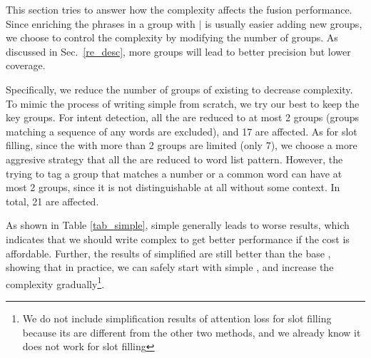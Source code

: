 This section tries to answer how the \RE complexity affects the fusion performance.
Since enriching the phrases in a \RE group with $|$ is usually easier adding new groups,
we choose to control the \RE complexity by modifying the number of groups.
As discussed in Sec.~\ref{re_desc}, more \RE groups will lead to better precision but lower coverage.

Specifically, we reduce the number of groups of existing \REs to decrease \RE complexity.
To mimic the process of writing simple \REs from scratch, we try our best to keep the key \RE groups.
For intent detection, all the \REs are reduced to at most 2 groups (groups matching a sequence of any words are excluded), and 17 \REs are affected.
As for slot filling, since the \REs with more than 2 groups are limited (only 7), we choose a more aggresive strategy that all the \REs are reduced to word list pattern.
However, the \REs trying to tag a \RE group that matches a number or a common word can have at most 2 groups, since it is not distinguishable at all without some context.
In total, 21 \REs are affected.

As shown in Table \ref{tab_simple}, simple \RE generally leads to worse results, which indicates that we should write complex \RE to get better performance if the cost is affordable.
Further, the results of simplified \RE are still better than the base \BLSTM, showing that in practice, we can safely start with simple \REs, and increase the complexity gradually\footnote{
We do not include simplification results of attention loss for slot filling because its \REs are different from the other two methods, and we already know it does not work for slot filling}.

